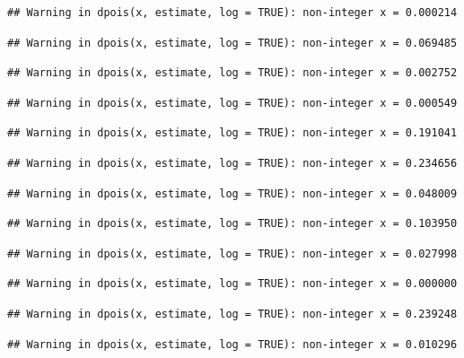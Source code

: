 \documentclass[]{article}
\begin{document}
\begin{verbatim}
## Warning in dpois(x, estimate, log = TRUE): non-integer x = 0.000214
\end{verbatim}

\begin{verbatim}
## Warning in dpois(x, estimate, log = TRUE): non-integer x = 0.069485
\end{verbatim}

\begin{verbatim}
## Warning in dpois(x, estimate, log = TRUE): non-integer x = 0.002752
\end{verbatim}

\begin{verbatim}
## Warning in dpois(x, estimate, log = TRUE): non-integer x = 0.000549
\end{verbatim}

\begin{verbatim}
## Warning in dpois(x, estimate, log = TRUE): non-integer x = 0.191041
\end{verbatim}

\begin{verbatim}
## Warning in dpois(x, estimate, log = TRUE): non-integer x = 0.234656
\end{verbatim}

\begin{verbatim}
## Warning in dpois(x, estimate, log = TRUE): non-integer x = 0.048009
\end{verbatim}

\begin{verbatim}
## Warning in dpois(x, estimate, log = TRUE): non-integer x = 0.103950
\end{verbatim}

\begin{verbatim}
## Warning in dpois(x, estimate, log = TRUE): non-integer x = 0.027998
\end{verbatim}

\begin{verbatim}
## Warning in dpois(x, estimate, log = TRUE): non-integer x = 0.000000
\end{verbatim}

\begin{verbatim}
## Warning in dpois(x, estimate, log = TRUE): non-integer x = 0.239248
\end{verbatim}

\begin{verbatim}
## Warning in dpois(x, estimate, log = TRUE): non-integer x = 0.010296
\end{verbatim}
\end{document}
